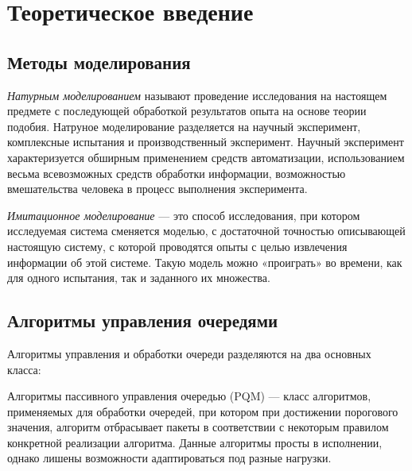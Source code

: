 
\chapter{Теоретическое введение}
\label{chap1}

\section{Методы моделирования}
\label{chap1:sec1}


\emph{Натурным моделированием} называют проведение исследования на настоящем
предмете с последующей обработкой результатов опыта на основе теории
подобия. Натруное моделирование разделяется на научный эксперимент,
комплексные испытания и производственный эксперимент. Научный
эксперимент характеризуется обширным применением средств
автоматизации, использованием весьма всевозможных средств обработки
информации, возможностью вмешательства человека в процесс выполнения
эксперимента.


\emph{Имитационное моделирование} --- это способ исследования, при котором
исследуемая система сменяется моделью, с достаточной точностью
описывающей настоящую систему, с которой проводятся опыты с целью
извлечения информации об этой системе. Такую модель можно «проиграть»
во времени, как для одного испытания, так и заданного их множества.



\section{Алгоритмы управления очередями}
\label{chap1:sec2}

Алгоритмы управления и обработки очереди разделяются на два основных класса:

Алгоритмы пассивного управления очередью (PQM) \cite{pqm} --- класс алгоритмов,
применяемых для обработки очередей, при котором при достижении порогового
значения, алгоритм отбрасывает пакеты в соответствии с некоторым правилом
конкретной реализации алгоритма. Данные алгоритмы просты в исполнении, однако
лишены возможности адаптироваться под разные нагрузки. 

